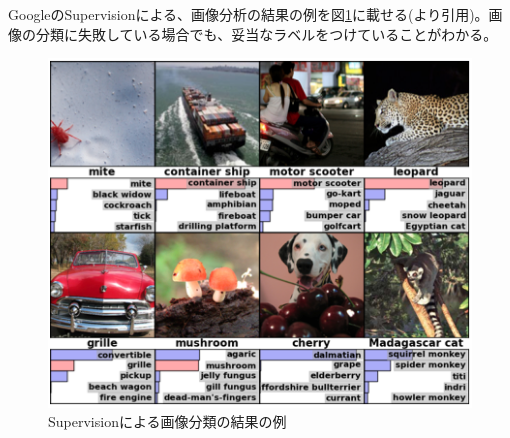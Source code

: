 GoogleのSupervisionによる、画像分析の結果の例を図\ref{c3_supervision}に載せる(\cite{krizhevsky2012imagenet}より引用)。画像の分類に失敗している場合でも、妥当なラベルをつけていることがわかる。\begin{figure}[tbp]
 \begin{center}
  \includegraphics[width=120mm]{img/c3/supervision}
 \end{center}
 \caption{Supervisionによる画像分類の結果の例}
 \label{c3_supervision}
\end{figure}

